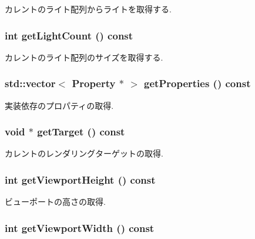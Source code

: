 カレントのライト配列からライトを取得する. \hypertarget{classm3g_1_1Graphics3D_7a08cfeb48d76ad5d8859a1fc0c77d98}{
\subsubsection[{getLightCount}]{\setlength{\rightskip}{0pt plus 5cm}int getLightCount () const}}
\label{classm3g_1_1Graphics3D_7a08cfeb48d76ad5d8859a1fc0c77d98}


カレントのライト配列のサイズを取得する. \hypertarget{classm3g_1_1Graphics3D_d87d3f8145ea47e2b736c6c3525dad5c}{
\subsubsection[{getProperties}]{\setlength{\rightskip}{0pt plus 5cm}std::vector$<$ Property $\ast$ $>$ getProperties () const}}
\label{classm3g_1_1Graphics3D_d87d3f8145ea47e2b736c6c3525dad5c}


実装依存のプロパティの取得. \hypertarget{classm3g_1_1Graphics3D_02d0033930c8e68f4d7ebd43abe7980a}{
\subsubsection[{getTarget}]{\setlength{\rightskip}{0pt plus 5cm}void $\ast$ getTarget () const}}
\label{classm3g_1_1Graphics3D_02d0033930c8e68f4d7ebd43abe7980a}


カレントのレンダリングターゲットの取得. \hypertarget{classm3g_1_1Graphics3D_d51e0c421126f5deb61b359cdb7dab2e}{
\subsubsection[{getViewportHeight}]{\setlength{\rightskip}{0pt plus 5cm}int getViewportHeight () const}}
\label{classm3g_1_1Graphics3D_d51e0c421126f5deb61b359cdb7dab2e}


ビューポートの高さの取得. \hypertarget{classm3g_1_1Graphics3D_768e5c057e2fa4c4b17a67134abbf89f}{
\subsubsection[{getViewportWidth}]{\setlength{\rightskip}{0pt plus 5cm}int getViewportWidth () const}}
\label{classm3g_1_1Graphics3D_768e5c057e2fa4c4b17a67134abbf89f}


